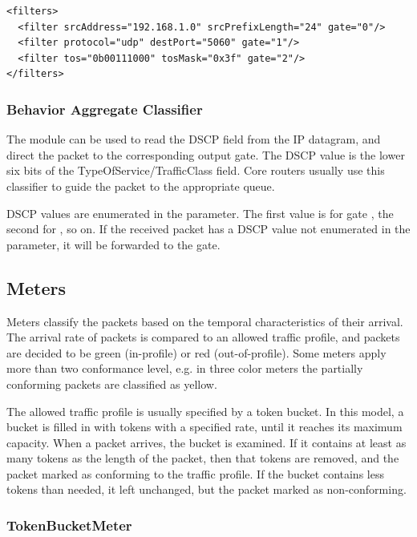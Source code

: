 \begin{verbatim}
<filters>
  <filter srcAddress="192.168.1.0" srcPrefixLength="24" gate="0"/>
  <filter protocol="udp" destPort="5060" gate="1"/>
  <filter tos="0b00111000" tosMask="0x3f" gate="2"/>
</filters>
\end{verbatim}
 
\subsubsection*{Behavior Aggregate Classifier}

The  module can be used to read
the DSCP field from the IP datagram, and direct the packet to
the corresponding output gate. The DSCP value is the lower
six bits of the TypeOfService/TrafficClass field. Core routers
usually use this classifier to guide the packet to the appropriate
queue.

DSCP values are enumerated in the  parameter.
The first value is for gate , the second for
, so on. If the received packet has a DSCP
value not enumerated in the  parameter, it will
be forwarded to the  gate.

\subsection{Meters}

Meters classify the packets based on the temporal characteristics
of their arrival. The arrival rate of packets is compared to an
allowed traffic profile, and packets are decided to be green
(in-profile) or red (out-of-profile). Some meters apply more than two
conformance level, e.g. in three color meters the partially conforming
packets are classified as yellow.

The allowed traffic profile is usually specified by a token bucket.
In this model, a bucket is filled in with tokens with a specified rate,
until it reaches its maximum capacity. When a packet arrives, the
bucket is examined. If it contains at least as many tokens as the
length of the packet, then that tokens are removed, and the packet
marked as conforming to the traffic profile. If the bucket contains
less tokens than needed, it left unchanged, but the packet marked
as non-conforming.


\subsubsection*{TokenBucketMeter}

